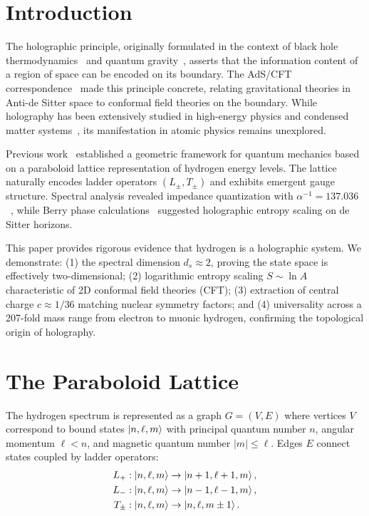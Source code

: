 \documentclass[aps,prl,twocolumn,showpacs,superscriptaddress,groupedaddress]{revtex4-2}
\newcommand{\alphainv}{\ensuremath{\alpha^{-1}}}
\begin{document}
\maketitle

\section{Introduction}

The holographic principle, originally formulated in the context of black hole thermodynamics~\cite{Bekenstein1973,Hawking1975} and quantum gravity~\cite{tHooft1993,Susskind1995}, asserts that the information content of a region of space can be encoded on its boundary. The AdS/CFT correspondence~\cite{Maldacena1998} made this principle concrete, relating gravitational theories in Anti-de Sitter space to conformal field theories on the boundary. While holography has been extensively studied in high-energy physics and condensed matter systems~\cite{Sachdev2010,Zaanen2015}, its manifestation in atomic physics remains unexplored.

Previous work~\cite{Paper1,Paper2,Paper3} established a geometric framework for quantum mechanics based on a paraboloid lattice representation of hydrogen energy levels. The lattice naturally encodes ladder operators $(L_\pm, T_\pm)$ and exhibits emergent gauge structure. Spectral analysis revealed impedance quantization with $\alphainv = 137.036$~\cite{Paper2}, while Berry phase calculations~\cite{Paper3} suggested holographic entropy scaling on de Sitter horizons.

This paper provides rigorous evidence that hydrogen is a holographic system. We demonstrate: (1) the spectral dimension $d_s \approx 2$, proving the state space is effectively two-dimensional; (2) logarithmic entropy scaling $S \sim \ln A$ characteristic of 2D conformal field theories (CFT); (3) extraction of central charge $c \approx 1/36$ matching nuclear symmetry factors; and (4) universality across a 207-fold mass range from electron to muonic hydrogen, confirming the topological origin of holography.

\section{The Paraboloid Lattice}

The hydrogen spectrum is represented as a graph $G = (V, E)$ where vertices $V$ correspond to bound states $\ket{n,\ell,m}$ with principal quantum number $n$, angular momentum $\ell < n$, and magnetic quantum number $|m| \leq \ell$. Edges $E$ connect states coupled by ladder operators:
\begin{align}
L_+ &: \ket{n,\ell,m} \to \ket{n+1,\ell+1,m}, \\
L_- &: \ket{n,\ell,m} \to \ket{n-1,\ell-1,m}, \\
T_\pm &: \ket{n,\ell,m} \to \ket{n,\ell,m\pm1}.
\end{align}
\end{document}
